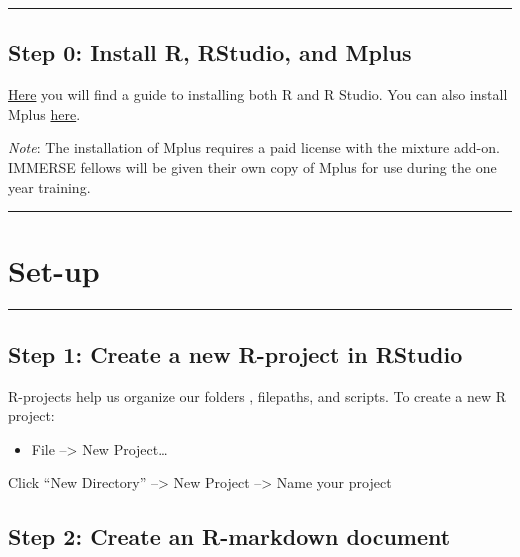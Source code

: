\documentclass[
]{book}
\providecommand{\tightlist}{%
  \setlength{\itemsep}{0pt}\setlength{\parskip}{0pt}}
\begin{document}
\begin{center}\rule{0.5\linewidth}{0.5pt}\end{center}

\subsection{Step 0: Install R, RStudio, and Mplus}\label{step-0-install-r-rstudio-and-mplus}

\href{https://posit.co/download/rstudio-desktop/}{Here} you will find a guide to installing both R and R Studio.
You can also install Mplus \href{https://www.statmodel.com/orderonline/}{here}.

\emph{Note}: The installation of Mplus requires a paid license with the mixture add-on.
IMMERSE fellows will be given their own copy of Mplus for use during the one year training.

\begin{center}\rule{0.5\linewidth}{0.5pt}\end{center}

\section{Set-up}\label{set-up}

\begin{center}\rule{0.5\linewidth}{0.5pt}\end{center}

\subsection{Step 1: Create a new R-project in RStudio}\label{step-1-create-a-new-r-project-in-rstudio}

R-projects help us organize our folders , filepaths, and scripts.
To create a new R project:

\begin{itemize}
\tightlist
\item
  File --\textgreater{} New Project\ldots{}
\end{itemize}

Click ``New Directory'' --\textgreater{} New Project --\textgreater{} Name your project

\subsection{Step 2: Create an R-markdown document}\label{step-2-create-an-r-markdown-document}
\end{document}
